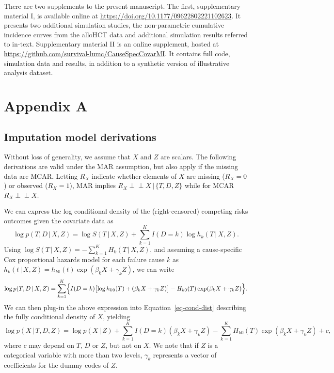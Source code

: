 \documentclass[
  letterpaper,
  paper=240mm:170mm,
  twoside=true,
  open=right,
  fontsize=10pt,
  pagesize=false,
  BCOR=15mm,
  DIV=14,
  headinclude=true,
  footinclude=false,
  headsepline=on]{scrbook}
\newcommand{\given}{\,|\,}
\newcommand{\indep}{\perp\!\!\!\!\perp}
\begin{document}

There are two supplements to the present manuscript. The first,
supplementary material I, is available online at
\url{https://doi.org/10.1177/09622802221102623}. It presents two
additional simulation studies, the non-parametric cumulative incidence
curves from the alloHCT data and additional simulation results referred
to in-text. Supplementary material II is an online supplement, hosted at
\url{https://github.com/survival-lumc/CauseSpecCovarMI}. It contains
full code, simulation data and results, in addition to a synthetic
version of illustrative analysis dataset.

\section*{Appendix A}\label{appendix-a}


\subsection*{Imputation model
derivations}\label{imputation-model-derivations}

Without loss of generality, we assume that \(X\) and \(Z\) are scalars.
The following derivations are valid under the MAR assumption, but also
apply if the missing data are MCAR. Letting \(R_X\) indicate whether
elements of \(X\) are missing (\(R_X = 0\)) or observed (\(R_X = 1\)),
MAR implies \(R_X \indep X \given \{T,D,Z\}\) while for MCAR
\(R_X \indep X\).

We can express the log conditional density of the (right-censored)
competing risks outcomes given the covariate data as \begin{equation*}
    \log p(T, D \given X, Z) =  \log S(T \given X, Z) + \sum^K_{k = 1} I(D=k) \log h_k(T \given X, Z).
\end{equation*} Using
\(\log S(T \given X, Z) = -\sum^K_{k = 1} H_k(T \given X,Z)\), and
assuming a cause-specific Cox proportional hazards model for each
failure cause \(k\) as
\(h_k(t \given X, Z) = h_{k0}(t)\exp(\beta_k X + \gamma_k Z)\), we can
write \begin{equation*}
    \log p(T, D \given X, Z) = \sum^K_{k = 1} \Bigl\{ I(D=k) \bigl[\log h_{k0}(T) + (\beta_k X + \gamma_k Z)\bigr] -  H_{k0}(T)\exp(\beta_k X + \gamma_k Z) \Bigr\}.
\end{equation*} We can then plug-in the above expression into
Equation~\ref{eq-cond-dist} describing the fully conditional density of
\(X\), yielding \begin{equation*}
    \log p(X \given T,D,Z) = \log p(X \given Z) + \sum^K_{k = 1} I(D=k) (\beta_k X + \gamma_k Z) - \sum^K_{k = 1} H_{k0}(T)\exp(\beta_k X + \gamma_k Z) + c,
\end{equation*} where \(c\) may depend on \(T\), \(D\) or \(Z\), but not
on \(X\). We note that if \(Z\) is a categorical variable with more than
two levels, \(\gamma_k\) represents a vector of coefficients for the
dummy codes of \(Z\).
\end{document}
